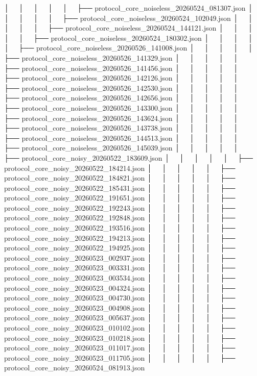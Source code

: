 │   │       │   │   │   ├── protocol_core_noiseless_20260524_081307.json
│   │       │   │   │   ├── protocol_core_noiseless_20260524_102049.json
│   │       │   │   │   ├── protocol_core_noiseless_20260524_144121.json
│   │       │   │   │   ├── protocol_core_noiseless_20260524_180302.json
│   │       │   │   │   ├── protocol_core_noiseless_20260526_141008.json
│   │       │   │   │   ├── protocol_core_noiseless_20260526_141329.json
│   │       │   │   │   ├── protocol_core_noiseless_20260526_141456.json
│   │       │   │   │   ├── protocol_core_noiseless_20260526_142126.json
│   │       │   │   │   ├── protocol_core_noiseless_20260526_142530.json
│   │       │   │   │   ├── protocol_core_noiseless_20260526_142656.json
│   │       │   │   │   ├── protocol_core_noiseless_20260526_143300.json
│   │       │   │   │   ├── protocol_core_noiseless_20260526_143624.json
│   │       │   │   │   ├── protocol_core_noiseless_20260526_143738.json
│   │       │   │   │   ├── protocol_core_noiseless_20260526_144513.json
│   │       │   │   │   ├── protocol_core_noiseless_20260526_145039.json
│   │       │   │   │   ├── protocol_core_noisy_20260522_183609.json
│   │       │   │   │   ├── protocol_core_noisy_20260522_184214.json
│   │       │   │   │   ├── protocol_core_noisy_20260522_184821.json
│   │       │   │   │   ├── protocol_core_noisy_20260522_185431.json
│   │       │   │   │   ├── protocol_core_noisy_20260522_191651.json
│   │       │   │   │   ├── protocol_core_noisy_20260522_192243.json
│   │       │   │   │   ├── protocol_core_noisy_20260522_192848.json
│   │       │   │   │   ├── protocol_core_noisy_20260522_193516.json
│   │       │   │   │   ├── protocol_core_noisy_20260522_194213.json
│   │       │   │   │   ├── protocol_core_noisy_20260522_194925.json
│   │       │   │   │   ├── protocol_core_noisy_20260523_002937.json
│   │       │   │   │   ├── protocol_core_noisy_20260523_003331.json
│   │       │   │   │   ├── protocol_core_noisy_20260523_003534.json
│   │       │   │   │   ├── protocol_core_noisy_20260523_004324.json
│   │       │   │   │   ├── protocol_core_noisy_20260523_004730.json
│   │       │   │   │   ├── protocol_core_noisy_20260523_004908.json
│   │       │   │   │   ├── protocol_core_noisy_20260523_005637.json
│   │       │   │   │   ├── protocol_core_noisy_20260523_010102.json
│   │       │   │   │   ├── protocol_core_noisy_20260523_010218.json
│   │       │   │   │   ├── protocol_core_noisy_20260523_011017.json
│   │       │   │   │   ├── protocol_core_noisy_20260523_011705.json
│   │       │   │   │   ├── protocol_core_noisy_20260524_081913.json
